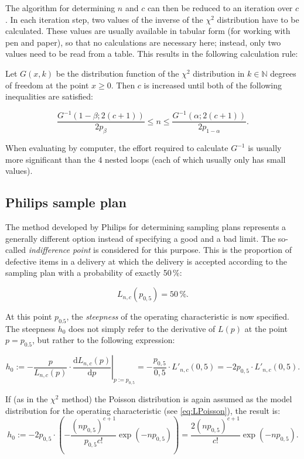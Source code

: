 \documentclass[a4paper,11pt,oneside]{article}
\begin{document}
The algorithm for determining $n$ and $c$ can then be reduced to an iteration over $c$. In each iteration step, two values of the inverse of the $\chi^2$ distribution have to be calculated. These values are usually available in tabular form (for working with pen and paper), so that no calculations are necessary here; instead, only two values need to be read from a table. This results in the following calculation rule:

Let $G(x,k)$ be the distribution function of the $\chi^2$ distribution in $k\in\mathbb N$ degrees of freedom at the point $x\ge0$. Then $c$ is increased until both of the following inequalities are satisfied:

$$
\frac{G^{-1}(1-\beta;2(c+1))}{2p_\beta}\le n\le\frac{G^{-1}(\alpha;2(c+1))}{2p_{1-\alpha}}.
$$

When evaluating by computer, the effort required to calculate $G^{-1}$ is usually more significant than the 4 nested loops (each of which usually only has small values).

\subsection{Philips sample plan}

The method developed by Philips for determining sampling plans represents a generally different option instead of specifying a good and a bad limit. The so-called \emph{indifference point} is considered for this purpose. This is the proportion of defective items in a delivery at which the delivery is accepted according to the sampling plan with a probability of exactly 50\,\%:

$$
L_{n,c}(p_{0{,}5})=50\,\%.
$$

At this point $p_{0.5}$, the \emph{steepness} of the operating characteristic is now specified. The steepness $h_0$ does not simply refer to the derivative of $L(p)$ at the point $p=p_{0.5}$, but rather to the following expression:

$$
h_0:=
\left.-\frac{p}{L_{n,c}(p)}\cdot\frac{\mathrm{d}L_{n,c}(p)}{\mathrm{d}p}\right|_{p:=p_{0{,}5}}=
-\frac{p_{0{,}5}}{0{,}5}\cdot L'_{n,c}(0{,}5)=
-2p_{0{,}5}\cdot L'_{n,c}(0{,}5).
$$

If (as in the $\chi^2$ method) the Poisson distribution is again assumed as the model distribution for the operating characteristic (see \eqref{eq:LPoisson}), the result is:
$$
h_0:=
-2p_{0{,}5}\cdot
\left(-\frac{(np_{0{,}5})^{c+1}}{p_{0{,}5}c!}\exp(-np_{0{,}5})\right)=
\frac{2(np_{0{,}5})^{c+1}}{c!}\exp(-np_{0{,}5}).
$$
\end{document}
